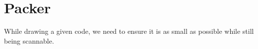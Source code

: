 \section{Packer}

While drawing a given code, we need to ensure it is as small as possible while still being scannable.